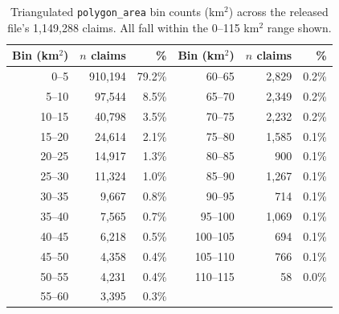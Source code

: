 \begin{table}[h]
\centering
\begin{tabular}{rrr@{\hspace{2em}}rrr}
\toprule
Bin (km$^2$) & $n$ claims & \% & Bin (km$^2$) & $n$ claims & \% \\
\midrule
0--5 & 910,194 & 79.2\% & 60--65 & 2,829 & 0.2\% \\
5--10 & 97,544 & 8.5\% & 65--70 & 2,349 & 0.2\% \\
10--15 & 40,798 & 3.5\% & 70--75 & 2,232 & 0.2\% \\
15--20 & 24,614 & 2.1\% & 75--80 & 1,585 & 0.1\% \\
20--25 & 14,917 & 1.3\% & 80--85 & 900 & 0.1\% \\
25--30 & 11,324 & 1.0\% & 85--90 & 1,267 & 0.1\% \\
30--35 & 9,667 & 0.8\% & 90--95 & 714 & 0.1\% \\
35--40 & 7,565 & 0.7\% & 95--100 & 1,069 & 0.1\% \\
40--45 & 6,218 & 0.5\% & 100--105 & 694 & 0.1\% \\
45--50 & 4,358 & 0.4\% & 105--110 & 766 & 0.1\% \\
50--55 & 4,231 & 0.4\% & 110--115 & 58 & 0.0\% \\
55--60 & 3,395 & 0.3\% &  & &  \\
\bottomrule
\end{tabular}
\caption{Triangulated \texttt{polygon\_area} bin counts (km$^2$) across the released file's 1,149,288 claims. All fall within the 0--115 km$^2$ range shown.}
\label{tab:polygon-area-histogram}
\end{table}
